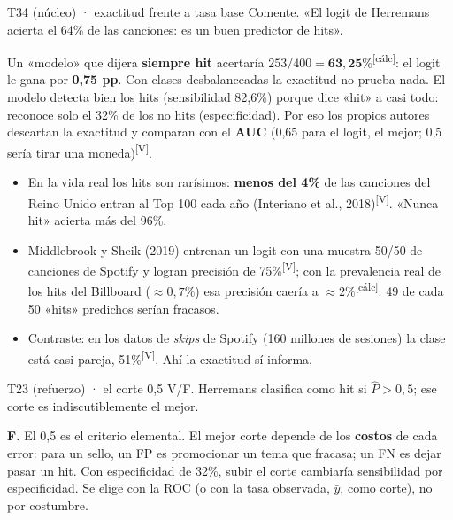 \documentclass[10pt,a4paper]{article}
\newcommand{\V}{\textsuperscript{\textcolor{green!45!black}{[V]}}}
\newcommand{\calc}{\textsuperscript{\textcolor{blue!60!black}{[cálc]}}}
\newcommand{\Ph}{\hat P}
\begin{document}
\begin{enun}{T34 (núcleo) · exactitud frente a tasa base}
Comente. «El logit de Herremans acierta el 64\% de las canciones: es un buen predictor de hits».
\end{enun}
\begin{ejemplar}
Un «modelo» que dijera \textbf{siempre hit} acertaría $253/400=\mathbf{63{,}25\%}$\calc: el logit le gana por \textbf{0,75 pp}. Con clases desbalanceadas la exactitud no prueba nada. El modelo detecta bien los hits (sensibilidad 82,6\%) porque dice «hit» a casi todo: reconoce solo el 32\% de los no hits (especificidad). Por eso los propios autores descartan la exactitud y comparan con el \textbf{AUC} (0,65 para el logit, el mejor; 0,5 sería tirar una moneda)\V.
\end{ejemplar}
\begin{trampa}
\begin{itemize}[leftmargin=*,itemsep=0pt,topsep=0pt]
\item En la vida real los hits son rarísimos: \textbf{menos del 4\%} de las canciones del Reino Unido entran al Top 100 cada año (Interiano et al., 2018)\V. «Nunca hit» acierta más del 96\%.
\item Middlebrook y Sheik (2019) entrenan un logit con una muestra 50/50 de canciones de Spotify y logran precisión de 75\%\V; con la prevalencia real de los hits del Billboard ($\approx0{,}7\%$) esa precisión caería a $\approx2\%$\calc: 49 de cada 50 «hits» predichos serían fracasos.
\item Contraste: en los datos de \emph{skips} de Spotify (160 millones de sesiones) la clase está casi pareja, 51\%\V. Ahí la exactitud sí informa.
\end{itemize}
\end{trampa}

\begin{enun}{T23 (refuerzo) · el corte 0,5}
V/F. Herremans clasifica como hit si $\Ph>0{,}5$; ese corte es indiscutiblemente el mejor.
\end{enun}
\begin{ejemplar}
\textbf{F.} El 0,5 es el criterio elemental. El mejor corte depende de los \textbf{costos} de cada error: para un sello, un FP es promocionar un tema que fracasa; un FN es dejar pasar un hit. Con especificidad de 32\%, subir el corte cambiaría sensibilidad por especificidad. Se elige con la ROC (o con la tasa observada, $\bar y$, como corte), no por costumbre.
\end{ejemplar}
\end{document}
